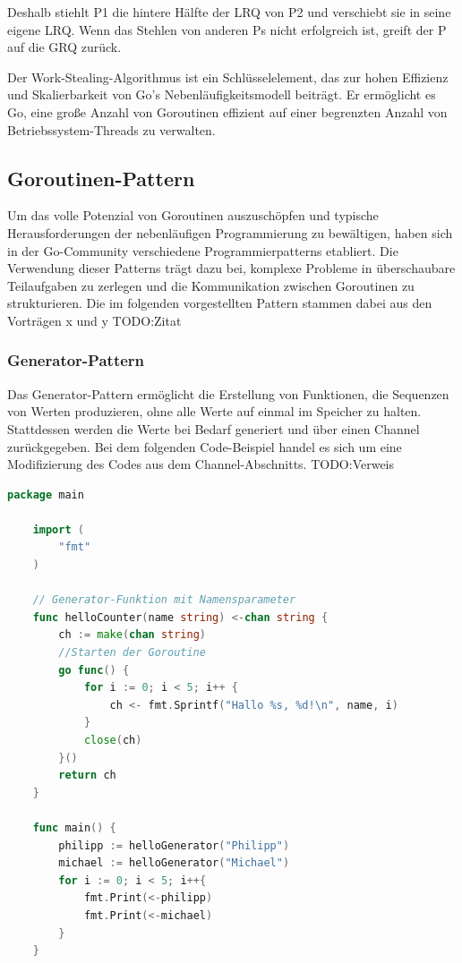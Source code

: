 \documentclass[fontsize=12pt,paper=a4,twoside=semi,parskip=half-,headsepline,headinclude]{scrreprt}
\begin{document}
Deshalb stiehlt P1 die hintere Hälfte der LRQ von P2 und verschiebt sie in seine eigene LRQ. Wenn das Stehlen von anderen Ps nicht erfolgreich ist, greift der P auf die GRQ zurück.

Der Work-Stealing-Algorithmus ist ein Schlüsselelement, das zur hohen Effizienz und Skalierbarkeit von Go's Nebenläufigkeitsmodell beiträgt. Er ermöglicht es Go, eine große Anzahl von Goroutinen effizient auf einer begrenzten Anzahl von Betriebssystem-Threads zu verwalten.

\subsection{Goroutinen-Pattern}

Um das volle Potenzial von Goroutinen auszuschöpfen und typische Herausforderungen der nebenläufigen Programmierung zu bewältigen, haben sich in der Go-Community verschiedene Programmierpatterns etabliert. Die Verwendung dieser Patterns trägt dazu bei, komplexe Probleme in überschaubare Teilaufgaben zu zerlegen und die Kommunikation zwischen Goroutinen zu strukturieren. Die im folgenden vorgestellten Pattern stammen dabei aus den Vorträgen x und y TODO:Zitat

\subsubsection{Generator-Pattern}

Das Generator-Pattern ermöglicht die Erstellung von Funktionen, die Sequenzen von Werten produzieren, ohne alle Werte auf einmal im Speicher zu halten. Stattdessen werden die Werte bei Bedarf generiert und über einen Channel zurückgegeben. Bei dem folgenden Code-Beispiel handel es sich um eine Modifizierung des Codes aus dem Channel-Abschnitts. TODO:Verweis

\begin{lstlisting}[language=Go,extendedchars=true]
	package main
	
	import (
		"fmt"
	)

	// Generator-Funktion mit Namensparameter
	func helloCounter(name string) <-chan string {
		ch := make(chan string)
		//Starten der Goroutine
		go func() {
			for i := 0; i < 5; i++ {
				ch <- fmt.Sprintf("Hallo %s, %d!\n", name, i)
			}
			close(ch)
		}()
		return ch
	}

	func main() {
		philipp := helloGenerator("Philipp")
		michael := helloGenerator("Michael")
		for i := 0; i < 5; i++{
			fmt.Print(<-philipp)
			fmt.Print(<-michael)
		}
	}
\end{lstlisting}
\end{document}
